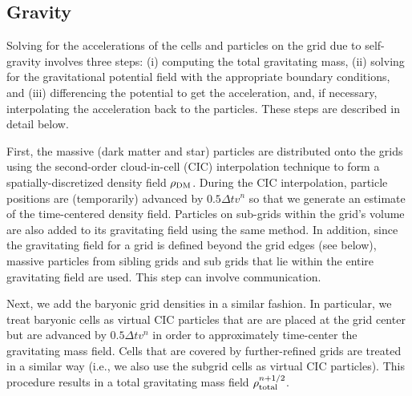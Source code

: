 


\subsection{Gravity}
\label{sec.gravity}

Solving for the accelerations of the cells and particles on the grid due to self-gravity involves three steps: (i) computing the total gravitating mass, (ii) solving for the gravitational potential field with the appropriate boundary conditions, and (iii) differencing the potential to get the acceleration, and, if necessary, interpolating the acceleration back to the particles. These steps are described in detail below.

First, the massive (dark matter and star) particles are distributed onto the grids using the second-order cloud-in-cell (CIC) interpolation technique \citep{Hockney88} to form a spatially-discretized density field $\rho_{\rm DM}$.  During the CIC interpolation, particle positions are (temporarily) advanced by $0.5 \Delta t v^n$ so that we generate an estimate of the time-centered density field.  Particles on sub-grids within the grid's volume are also added to its gravitating field using the same method. In addition, since the gravitating field for a grid is defined beyond the grid edges (see below), massive particles from sibling grids and sub grids that lie within the entire gravitating field are used.  This step can involve communication.

Next, we add the baryonic grid densities in a similar fashion.  In particular, we treat baryonic cells as virtual CIC particles that are are placed at the grid center but are advanced by $0.5 \Delta t v^n$ in order to approximately time-center the gravitating mass field.  Cells that are covered by further-refined grids are treated in a similar way (i.e., we also use the subgrid cells as virtual CIC particles).  This procedure results in a total gravitating mass field $\rho_{\rm total}^{n+1/2}$.

